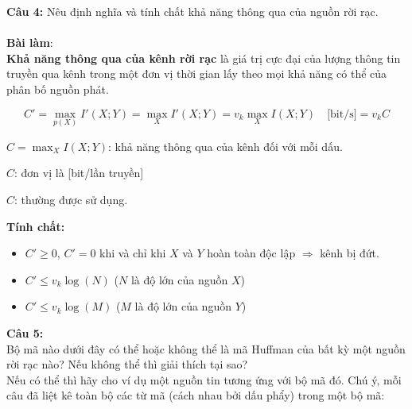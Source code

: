 \documentclass[12pt]{article}
\begin{document}
\newpage
\textbf{Câu 4:} Nêu định nghĩa và tính chất khả năng thông qua của nguồn rời rạc.
\\
\\
\textbf{Bài làm}: 
\\
\textbf{Khả năng thông qua của kênh rời rạc} là giá trị cực đại của lượng thông tin truyền qua kênh trong một đơn vị thời gian lấy theo mọi khả năng có thể của phân bố nguồn phát.

\[
C' = \max_{p(X)} I'(X; Y) = \max_X I'(X; Y) = v_k \max_X I(X; Y) \quad \text{[bit/s]}= v_k C
\]
   \begin{flushleft}
$C = \max_X I(X; Y)$: khả năng thông qua của kênh đối với mỗi dấu.

$C$: đơn vị là [bit/lần truyền]

$C$: thường được sử dụng.
\end{flushleft}


\textbf{Tính chất:}
\begin{itemize}
    \item $C' \geq 0$, $C' = 0$ khi và chỉ khi $X$ và $Y$ hoàn toàn độc lập $\Rightarrow$ kênh bị đứt.
    \item $C' \leq v_k \log(N)$ \quad ($N$ là độ lớn của nguồn $X$)
    \item $C' \leq v_k \log(M)$ \quad ($M$ là độ lớn của nguồn $Y$)
\end{itemize}

\newpage 

\textbf{Câu 5:} \\
Bộ mã nào dưới đây có thể hoặc không thể là mã Huffman của bất kỳ một nguồn rời rạc nào? Nếu không thể thì giải thích tại sao? \\
Nếu có thể thì hãy cho ví dụ một nguồn tin tương ứng với bộ mã đó. Chú ý, mỗi câu đã liệt kê toàn bộ các từ mã (cách nhau bởi dấu phẩy) trong một bộ mã:
\end{document}

